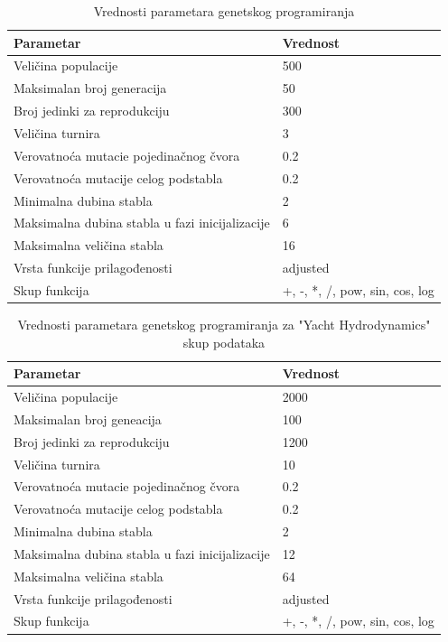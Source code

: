 \documentclass[main.tex]{subfiles}
\begin{document}
\begin{table}[ht]
\caption{Vrednosti parametara genetskog programiranja} 
\label{tbl:gpParameters}
\centering
\begin{tabular}{l l} %
\hline 
Parametar & Vrednost \\ [0.5ex] 
\hline 
Veličina populacije & 500  \\ 
Maksimalan broj generacija & 50  \\
Broj jedinki za reprodukciju & 300  \\
Veličina turnira & 3 \\
Verovatnoća mutacie pojedinačnog čvora & 0.2  \\
Verovatnoća mutacije celog podstabla & 0.2  \\ 
Minimalna dubina stabla & 2 \\
Maksimalna dubina stabla u fazi inicijalizacije & 6 \\
Maksimalna veličina stabla & 16 \\
Vrsta funkcije prilagođenosti & adjusted \\ 
Skup funkcija &  +, -, *, /, pow, sin, cos, log \\ [1ex] %
\hline 
\end{tabular}
\end{table}


\begin{table}[ht]
\caption{Vrednosti parametara genetskog programiranja za "Yacht Hydrodynamics" skup podataka} 
\label{tbl:gpParametersYacht}
\centering
\begin{tabular}{l l} %
\hline 
Parametar & Vrednost \\ [0.5ex] 
\hline 
Veličina populacije & 2000  \\ 
Maksimalan broj geneacija & 100  \\
Broj jedinki za reprodukciju & 1200  \\
Veličina turnira & 10 \\
Verovatnoća mutacie pojedinačnog čvora & 0.2  \\
Verovatnoća mutacije celog podstabla & 0.2  \\ 
Minimalna dubina stabla & 2 \\
Maksimalna dubina stabla u fazi inicijalizacije & 12 \\
Maksimalna veličina stabla & 64 \\
Vrsta funkcije prilagođenosti & adjusted \\ 
Skup funkcija &  +, -, *, /, pow, sin, cos, log \\ [1ex] %
\hline 
\end{tabular}
\end{table}
\end{document}
